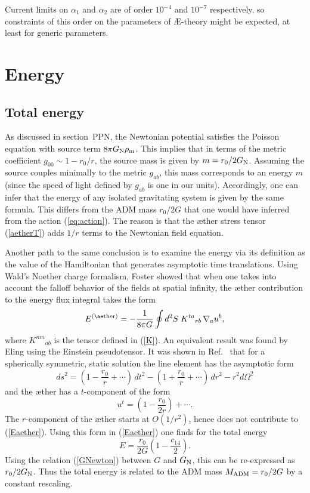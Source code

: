 \documentclass[aps]{ws-procs9x6}
\def\beq{\begin{equation}}
\def\eeq{\end{equation}}
\def\a{\alpha}
\begin{document}
Current limits on $\a_1$ and $\a_2$ are of order $10^{-4}$ and
$10^{-7}$ respectively, so constraints of this order on the
parameters of {\AE}-theory might be expected, at least for
generic parameters.



\section{Energy}

\subsection{Total energy}

As discussed in section~{PPN}, the Newtonian potential satisfies
the Poisson equation with source term $8\pi G_{\rm N}\rho_{\rm
m}$. This implies that in terms of the metric coefficient
$g_{00}\sim 1-r_0/r$, the source mass is given by $m=r_0/2G_{\rm
N}$. Assuming the source couples minimally to the metric
$g_{ab}$, this mass corresponds to an energy $m$ (since the speed
of light defined by $g_{ab}$ is one in our units). Accordingly,
one can infer that the energy of any isolated gravitating system
is given by the same formula. This differs from the ADM mass
$r_0/2G$ that one would have inferred from the action
(\ref{eq:action}). The reason is that the {\ae}ther stress tensor
(\ref{aetherT}) adds $1/r$ terms to the Newtonian field equation.

Another path to the same conclusion is to examine the energy via
its definition as the value of the Hamiltonian that generates
asymptotic time translations. Using Wald's Noether charge
formalism, Foster\cite{BZ} showed that when one takes into
account the falloff behavior of the fields at spatial infinity,
the {\ae}ther contribution to the energy flux integral takes the
form
%
\beq E^{(\rm {\ae}ther)}= -\frac{1}{8\pi G}\oint d^2S\;
K^{ta}{}_{rb}\, \nabla_a u^b, \label{Eaether} \eeq
%
where $K^{mn}{}_{ab}$ is the tensor defined in (\ref{K}).
An equivalent result was found by Eling\cite{Eling776}
using the Einstein pseudotensor.
It was shown in Ref.~ that for a spherically
symmetric, static solution the line element has the
asymptotic form
%
\beq
ds^2= (1-\frac{r_0}{r}+\cdots)\, dt^2
- (1+\frac{r_0}{r}+\cdots)\, dr^2-r^2d\Omega^2
\eeq
%
and the {\ae}ther has a $t$-component of the form
%
\beq
u^t=(1-\frac{r_0}{2r}) + \cdots.
\eeq
%
The $r$-component of the {\ae}ther starts at $O(1/r^2)$, hence
does not contribute to (\ref{Eaether}). Using this form in
(\ref{Eaether}) one finds for the total energy
%
\beq
E=\frac{r_0}{2G}(1 - \frac{c_{14}}{2}).
\label{Etot}
\eeq
%
Using the relation (\ref{GNewton}) between $G$ and $G_{\rm N}$,
this can be re-expressed as $r_0/2G_{\rm N}$. Thus the total
energy is related to the ADM mass $M_{\rm ADM}=r_0/2G$ by a
constant rescaling.
\end{document}
